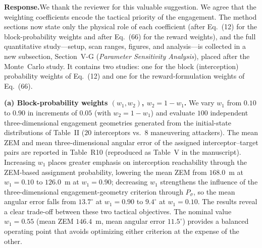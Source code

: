 \documentclass[11pt]{article}
\newcommand{\rsp}{\medskip\noindent\textbf{Response.}\quad}
\begin{document}
\rsp We thank the reviewer for this valuable suggestion. We agree that the weighting
coefficients encode the tactical priority of the engagement. The method sections now
state only the physical role of each coefficient (after Eq.~(12) for the block-probability
weights and after Eq.~(66) for the reward weights), and the full quantitative study---setup,
scan ranges, figures, and analysis---is collected in a new subsection,
Section~V-G (\emph{Parameter Sensitivity Analysis}), placed after the Monte~Carlo study.
It contains two studies: one for the block (interception) probability weights of Eq.~(12)
and one for the reward-formulation weights of Eq.~(66).

\textbf{(a) Block-probability weights $(w_1,w_2)$, $w_2=1-w_1$.} We vary $w_1$ from
$0.10$ to $0.90$ in increments of $0.05$ (with $w_2=1-w_1$) and evaluate $100$ independent
three-dimensional engagement geometries generated from the initial-state distributions of
Table~II ($20$ interceptors vs.\ $8$ maneuvering attackers). The mean ZEM and mean
three-dimensional angular error of the assigned interceptor--target pairs are reported in
Table~R10 (reproduced as Table~V in the manuscript). Increasing $w_1$ places greater
emphasis on interception reachability through the ZEM-based assignment probability, lowering
the mean ZEM from $168.0$~m at $w_1{=}0.10$ to $126.0$~m at $w_1{=}0.90$; decreasing $w_1$
strengthens the influence of the three-dimensional engagement-geometry criterion through
$P_{\sigma}$, so the mean angular error falls from $13.7^{\circ}$ at $w_1{=}0.90$ to
$9.4^{\circ}$ at $w_1{=}0.10$. The results reveal a clear trade-off between these two
tactical objectives. The nominal value $w_1{=}0.55$ (mean ZEM $146.4$~m, mean angular error
$11.5^{\circ}$) provides a balanced operating point that avoids optimizing either criterion
at the expense of the other.
\end{document}

